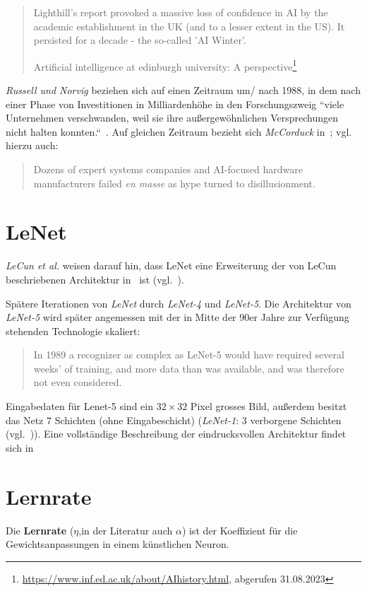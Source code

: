 \blockquote[Artificial intelligence at edinburgh university: A perspective\footnote{\url{https://www.inf.ed.ac.uk/about/AIhistory.html}, abgerufen 31.08.2023}]{
    Lighthill's report provoked a massive loss of confidence in AI by the academic establishment in the UK (and to a lesser extent in the US). It persisted for a decade - the so-called 'AI Winter'.
}

\noindent
\textit{Russell und Norvig} beziehen sich auf einen Zeitraum um/ nach 1988, in dem nach einer Phase von Investitionen in Milliardenhöhe in den Forschungszweig ``viele Unternehmen verschwanden, weil sie ihre außergewöhnlichen Versprechungen nicht halten konnten.``~\cite[48]{RN09}. Auf gleichen Zeitraum bezieht sich \textit{McCorduck} in~\cite[432]{Mcc04}; vgl. hierzu auch:

\blockquote[{\cite[656; Hervorhebung i.O.]{Gar19}}]{
    Dozens of expert systems companies and AI-focused hardware manufacturers failed \textit{en masse} as hype turned to disillusionment.
}



\section{LeNet}\label{appendix:lenet1}

\textit{LeCun et al.} weisen darauf hin, dass LeNet eine Erweiterung der von LeCun beschriebenen Architektur in~\cite{Cun89} ist (vgl.~\cite[544]{CBD+89}).

Spätere Iterationen von \textit{LeNet} durch \textit{LeNet-4} und \textit{LeNet-5}. Die Architektur von \textit{LeNet-5} wird später angemessen mit der in Mitte der 90er Jahre zur Verfügung stehenden Technologie skaliert:

\blockquote[{\cite[15]{CBBH98}}]{
    In 1989 a recognizer as complex as LeNet-5 would have required several weeks' of training, and more data than was available, and was therefore not even considered.
}
\noindent
Eingabedaten für Lenet-5 sind ein $32 \times 32$ Pixel grosses Bild, außerdem besitzt das Netz 7 Schichten (ohne Eingabeschicht) (\textit{LeNet-1}: 3 verborgene Schichten (vgl.~\cite[544]{CBD+89})).
Eine vollständige Beschreibung der eindrucksvollen Architektur findet sich in~\cite[7 f.]{CBBH98}

\section{Lernrate}
Die \textbf{Lernrate} ($\eta$,in der Literatur auch $\alpha$) ist der Koeffizient für die Gewichtsanpassungen in einem künstlichen Neuron.

